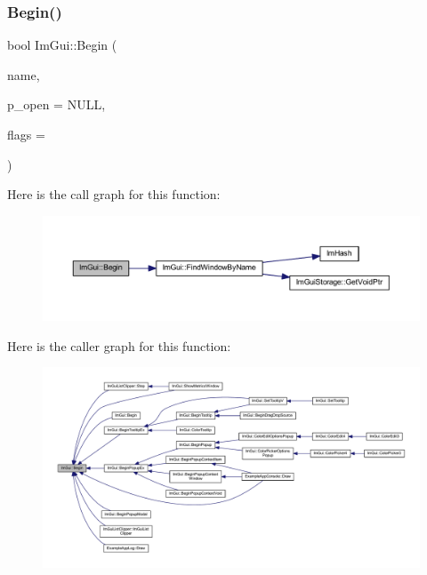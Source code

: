 \subsubsection{\texorpdfstring{Begin()}{Begin()}\hspace{0.1cm}{\footnotesize\ttfamily [1/2]}}
{\footnotesize\ttfamily bool Im\+Gui\+::\+Begin (\begin{DoxyParamCaption}\item[{const char $\ast$}]{name,  }\item[{bool $\ast$}]{p\+\_\+open = {\ttfamily NULL},  }\item[{\mbox{\hyperlink{imgui_8h_a0b8e067ab4f7a818828c8d89e531addc}{Im\+Gui\+Window\+Flags}}}]{flags = {} }\end{DoxyParamCaption})}

Here is the call graph for this function\+:
\nopagebreak
\begin{figure}[H]
\begin{center}
\leavevmode
\includegraphics[width=350pt]{namespace_im_gui_a581e58db0bc930bafa4a5d23093a2b99_cgraph}
\end{center}
\end{figure}
Here is the caller graph for this function\+:
\nopagebreak
\begin{figure}[H]
\begin{center}
\leavevmode
\includegraphics[width=350pt]{namespace_im_gui_a581e58db0bc930bafa4a5d23093a2b99_icgraph}
\end{center}
\end{figure}
\mbox{\label{namespace_im_gui_a288e01ff1c8102d6374a6b1e409b9878}} 
